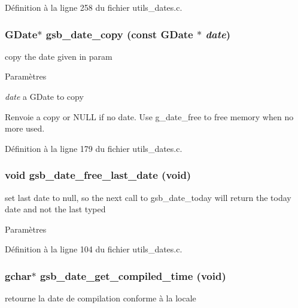 Définition à la ligne 258 du fichier utils\_\-dates.c.

\subsubsection[{gsb\_\-date\_\-copy}]{\setlength{\rightskip}{0pt plus 5cm}GDate$\ast$ gsb\_\-date\_\-copy (const GDate $\ast$ {\em date})}\label{utils__dates_8h_ad688d2e013a4c82fa7e1cb47f64054d4}
copy the date given in param


\begin{DoxyParams}{Paramètres}
\item[{\em date}]a GDate to copy\end{DoxyParams}
\begin{DoxyReturn}{Renvoie}
a copy or NULL if no date. Use g\_\-date\_\-free to free memory when no more used. 
\end{DoxyReturn}


Définition à la ligne 179 du fichier utils\_\-dates.c.

\subsubsection[{gsb\_\-date\_\-free\_\-last\_\-date}]{\setlength{\rightskip}{0pt plus 5cm}void gsb\_\-date\_\-free\_\-last\_\-date (void)}\label{utils__dates_8h_af8f672b19112b497c550cd33caf35d86}
set last date to null, so the next call to gsb\_\-date\_\-today will return the today date and not the last typed


\begin{DoxyParams}{Paramètres}
\item[{\em }]\end{DoxyParams}


Définition à la ligne 104 du fichier utils\_\-dates.c.

\subsubsection[{gsb\_\-date\_\-get\_\-compiled\_\-time}]{\setlength{\rightskip}{0pt plus 5cm}gchar$\ast$ gsb\_\-date\_\-get\_\-compiled\_\-time (void)}\label{utils__dates_8h_aabfe81bd576f533aff2f7cfebd52161c}
retourne la date de compilation conforme à la locale 

